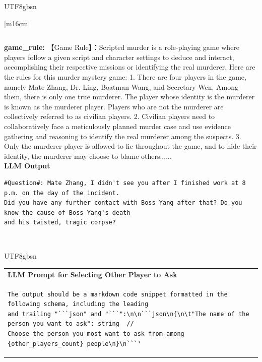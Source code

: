 \documentclass[11pt]{article}
\begin{document}
{\begin{CJK}{UTF8}{gbsn}
\begin{table}[ht!]
\begin{minipage}[t]{\linewidth}
\begin{tabular}{|m{16cm}|}
\begin{verbatim}
\end{verbatim}
\textbf{   game\_rule:} \small【Game Rule】：Scripted murder is a role-playing game where players follow a given script and character settings to deduce and interact, accomplishing their respective missions or identifying the real murderer. Here are the rules for this murder mystery game: 1. There are four players in the game, namely Mate Zhang, Dr. Ling, Boatman Wang, and Secretary Wen. Among them, there is only one true murderer. The player whose identity is the murderer is known as the murderer player. Players who are not the murderer are collectively referred to as civilian players. 2. Civilian players need to collaboratively face a meticulously planned murder case and use evidence gathering and reasoning to identify the real murderer among the suspects. 3. Only the murderer player is allowed to lie throughout the game, and to hide their identity, the murderer may choose to blame others......\\

\hline
{}  \textbf{LLM Output}  \\
\hline
\small \begin{verbatim}
#Question#: Mate Zhang, I didn't see you after I finished work at 8 p.m. on the day of the incident.
Did you have any further contact with Boss Yang after that? Do you know the cause of Boss Yang's death
and his twisted, tragic corpse?
\end{verbatim} \\
\hline
\end{tabular}
\end{minipage}

\caption{LLM prompt and output for asking questions. ( English Translation)}
\end{table}
\end{CJK}

\begin{CJK}{UTF8}{gbsn}
\begin{table}[ht!]
\centering
\begin{minipage}[t]{\linewidth}
\begin{tabular}{|m{16cm}|}
\hline
\rowcolor{lightgray}  {\textbf{LLM Prompt for Selecting Other Player to Ask}} \\
\small \begin{verbatim}
The output should be a markdown code snippet formatted in the following schema, including the leading
and trailing "```json" and "```":\n\n```json\n{\n\t"The name of the person you want to ask": string  //
Choose the person you most want to ask from among {other_players_count} people\n}\n```'
\end{verbatim} \\


\end{tabular}
\end{minipage}
\end{table}
\end{CJK}}
\end{document}
